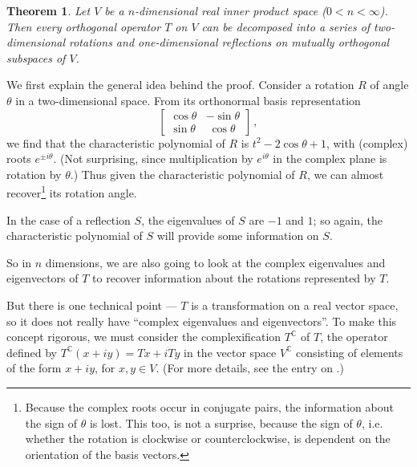 \documentclass[12pt]{article}
\newcommand{\Vc}{V^\mathbb{C}}
\newcommand{\Tc}{T^\mathbb{C}}
\newtheorem{thm}{Theorem}
\begin{document}
\begin{thm}
Let $V$ be a $n$-dimensional real inner product space ($0 < n < \infty$). Then every orthogonal operator $T$ on $V$
can be decomposed into a series of two-dimensional rotations and one-dimensional reflections
on mutually orthogonal subspaces of $V$.
\end{thm}

We first explain the general idea behind the proof.  Consider a rotation $R$ of angle $\theta$ in a two-dimensional space.  From its orthonormal basis representation
\[
\begin{bmatrix}
\cos \theta & -\sin \theta \\
\sin \theta & \; \cos \theta
\end{bmatrix}\,,
\]
we find that the characteristic polynomial of $R$ is $t^2 - 2 \cos \theta + 1$,
with (complex) roots $e^{\pm i\theta}$.  
(Not surprising, since multiplication by $e^{i\theta}$ in the complex plane is rotation
by $\theta$.)
Thus given the characteristic polynomial of $R$,
we can almost recover\footnote{Because the complex roots occur in conjugate pairs,
the information about the sign of $\theta$ is lost. This too, is not a surprise,
because the sign of $\theta$, i.e. whether the rotation is clockwise or counterclockwise,
is dependent on the orientation of the basis vectors.} its rotation angle.  

In the case of a reflection $S$, the eigenvalues of $S$ are $-1$ and $1$; so again, the characteristic polynomial of $S$ will provide some information on $S$.

So in $n$ dimensions, we are also going to look at the complex eigenvalues and eigenvectors of $T$ to recover information about the rotations represented by $T$.

But there is one technical point --- $T$ is a transformation on a real vector
space, so it does not really have ``complex eigenvalues and eigenvectors''.
To make this concept rigorous, we must consider the complexification $\Tc$ of $T$,
the operator defined by $\Tc(x+iy) = Tx + iTy$
in the vector space $\Vc$ consisting of elements of the form $x+iy$, for $x, y \in V$.
(For more details, see the entry on .)

\bigskip
\end{document}
